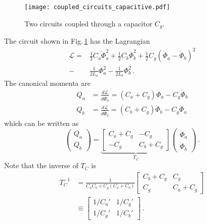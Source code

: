 

\begin{figure}
\begin{centering}
\texttt{[image: coupled\_circuits\_capacitive.pdf]}
\par\end{centering}
\caption{Two circuits coupled through a capacitor $C_g$.}
\label{Fig:coupledCircuits_capacitive}
\end{figure}

The circuit shown in Fig.\,\ref{Fig:coupledCircuits_capacitive} has the Lagrangian
\begin{align}
  \mathcal{L}
  =& \frac{1}{2}C_a\dot{\Phi}_a^2 + \frac{1}{2}C_b\dot{\Phi}_b^2
   + \frac{1}{2}C_g \left( \dot{\Phi}_a - \dot{\Phi}_b \right)^2 \nonumber \\
  -& \frac{1}{2L_a}\Phi_a^2 - \frac{1}{2L_b}\Phi_b^2 \, .
\end{align}
The canonical momenta are
\begin{align}
  Q_a &= \frac{d \mathcal{L}}{d\dot{\Phi}_a} = (C_a + C_g) \dot{\Phi}_a - C_g\dot{\Phi}_b \nonumber \\
  Q_b &= \frac{d \mathcal{L}}{d\dot{\Phi}_b} = (C_b + C_g) \dot{\Phi}_b - C_g\dot{\Phi}_a
\end{align}
which can be written as
\begin{equation}
  \left( \begin{array}{c} Q_a \\ Q_b \end{array} \right) =
  \underbrace{
    \left[ \begin{array}{cc} C_a + C_g & -C_g \\ -C_g & C_b + C_g \end{array} \right]}_{T_C}
  \left( \begin{array}{c} \dot{\Phi}_a \\ \dot{\Phi}_b \end{array} \right)
  \, .
\end{equation}
Note that the inverse of $T_C$ is
\begin{align}
  T_C^{-1}
  &= \frac{1}{C_a C_b + C_g (C_a + C_b)}
    \left[ \begin{array}{cc} C_b + C_g & C_g \\ C_g & C_a + C_g \end{array} \right] \nonumber \\
  &\equiv \left[
    \begin{array}{cc} 1/C_a' & 1/C_g' \\ 1/C_g' & 1/C_b' \end{array}
    \right] \, .
\end{align}
